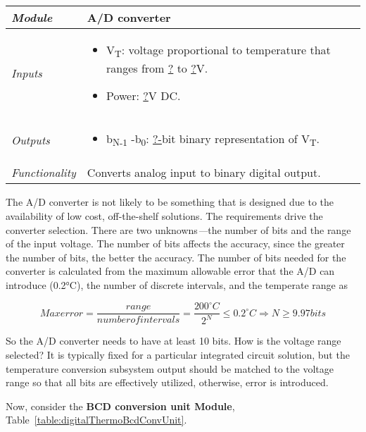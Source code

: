 \begin{table}[h]
\label{table:digitalThermoDigitalConverter}
\begin{tabular}{|l|m{10cm}|}
\hline
\emph{Module} & A/D converter\\ \hline
\emph{Inputs} & 
\begin{itemize}
\item
  V\textsubscript{T}: voltage proportional to temperature that ranges
  from \ul{?} to \ul{?}V.
\item  Power: \ul{?}V DC.
\end{itemize}  \\ \hline
\emph{Outputs} & 
\begin{itemize}
\item  b\textsubscript{N-1} -b\textsubscript{0}: \ul{?-}bit binary
  representation of V\textsubscript{T}.
\end{itemize}\\ \hline
\emph{Functionality} & Converts analog input to binary digital
output. \\ \hline
\end{tabular}
\end{table}



The A/D converter is not likely to be something that is designed due to
the availability of low cost, off-the-shelf solutions. The requirements
drive the converter selection. There are two unknowns\emph{---}the
number of bits and the range of the input voltage. The number of bits
affects the accuracy, since the greater the number of bits, the better
the accuracy. The number of bits needed for the converter is calculated
from the maximum allowable error that the A/D can introduce (0.2°C), the
number of discrete intervals, and the temperate range as

$$Max error = \frac{range}{number of intervals} = \frac{200^{\circ}  C}{2^N} \leq 0.2^{\circ}  C \Rightarrow N \geq 9.97 bits$$

So the A/D converter needs to have at least 10 bits. How is the voltage
range selected? It is typically fixed for a particular integrated
circuit solution, but the temperature conversion subsystem output should
be matched to the voltage range so that all bits are effectively
utilized, otherwise, error is introduced.

Now, consider 
the \textbf{BCD conversion unit Module}, 
Table~\ref{table:digitalThermoBcdConvUnit}.


